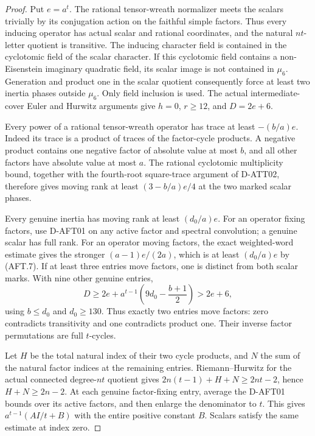 \begin{proof}
Put $e=a^t$. The rational tensor-wreath normalizer meets
the scalars trivially by its conjugation action on the
faithful simple factors. Thus every inducing operator
has actual scalar and rational coordinates, and the
natural $nt$-letter quotient is transitive. The inducing
character field is contained in the cyclotomic field of
the scalar character. If this cyclotomic field contains
a non-Eisenstein imaginary quadratic field, its scalar
image is not contained in $\mu_6$. Generation and product
one in the scalar quotient consequently force at least
two inertia phases outside $\mu_6$. Only field inclusion
is used. The actual intermediate-cover Euler and Hurwitz
arguments give $h=0$, $r\ge12$, and $D=2e+6$.

Every power of a rational tensor-wreath operator has trace
at least $-(b/a)e$. Indeed its trace is a product of traces
of the factor-cycle products. A negative product contains
one negative factor of absolute value at most $b$, and
all other factors have absolute value at most $a$.
The rational cyclotomic multiplicity bound, together with
the fourth-root square-trace argument of D-ATT02, therefore
gives moving rank at least $(3-b/a)e/4$ at the two marked
scalar phases.

Every genuine inertia has moving rank at least $(d_0/a)e$.
For an operator fixing factors, use D-AFT01 on any active
factor and spectral convolution; a genuine scalar has
full rank. For an operator moving factors, the exact
weighted-word estimate gives the stronger
$(a-1)e/(2a)$, which is at least $(d_0/a)e$ by (AFT.7).
If at least three entries move factors, one is distinct
from both scalar marks. With nine other genuine entries,
\[
 D\ge2e+a^{t-1}\left(9d_0-\frac{b+1}{2}\right)>2e+6,
                                                               \tag{AFT.17}
\]
using $b\le d_0$ and $d_0\ge130$. Thus exactly two entries
move factors: zero contradicts transitivity and one
contradicts product one. Their inverse factor permutations
are full $t$-cycles.

Let $H$ be the total natural index of their two cycle
products, and $N$ the sum of the natural factor indices
at the remaining entries. Riemann--Hurwitz for the actual
connected degree-$nt$ quotient gives
$2n(t-1)+H+N\ge2nt-2$, hence $H+N\ge2n-2$.
At each genuine factor-fixing entry, average the D-AFT01
bounds over its active factors, and then enlarge the
denominator to $t$. This gives
$a^{t-1}(AI/t+B)$ with the entire positive constant $B$.
Scalars satisfy the same estimate at index zero.


\end{proof}
